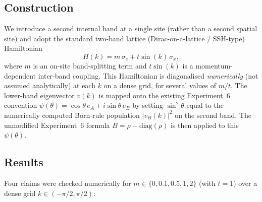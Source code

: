 \documentclass[11pt]{article}
\begin{document}
\subsection*{Construction}

We introduce a second internal band at a single site (rather than a second
spatial site) and adopt the standard two-band lattice (Dirac-on-a-lattice
/ SSH-type) Hamiltonian
\[
  H(k) = m\,\sigma_z + t\sin(k)\,\sigma_x,
\]
where $m$ is an on-site band-splitting term and $t\sin(k)$ is a
momentum-dependent inter-band coupling. This Hamiltonian is diagonalised
\emph{numerically} (not assumed analytically) at each $k$ on a dense grid,
for several values of $m/t$. The lower-band eigenvector $v(k)$ is mapped onto
the existing Experiment~6 convention $\psi(\theta) = \cos\theta\,e_A +
i\sin\theta\,e_B$ by setting $\sin^2\theta$ equal to the numerically computed
Born-rule population $|v_B(k)|^2$ on the second band. The unmodified
Experiment~6 formula $B = \rho - \mathrm{diag}(\rho)$ is then applied to this
$\psi(\theta)$.

\subsection*{Results}

Four claims were checked numerically for $m \in \{0, 0.1, 0.5, 1, 2\}$ (with
$t=1$) over a dense grid $k \in (-\pi/2, \pi/2)$:
\end{document}

